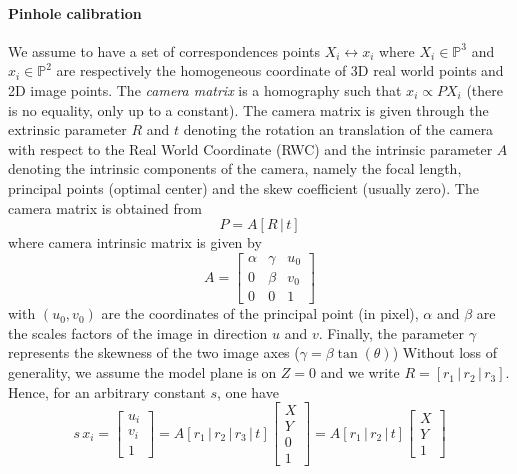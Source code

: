 \documentclass[11pt,a4paper]{article}
\begin{document}
\paragraph{Pinhole calibration}
We assume to have a set of correspondences points $X_i \leftrightarrow x_i$ where $X_i \in \mathbb{P}^3$ and $x_i \in \mathbb{P}^2$ are respectively the homogeneous coordinate of 3D real world points and 2D image points. The \textit{camera matrix} is a homography such that $x_i \propto PX_i$ (there is no equality, only up to a constant). The camera matrix is given through the extrinsic parameter $R$ and $t$ denoting the rotation an translation of the camera with respect to the Real World Coordinate (RWC) and the intrinsic parameter $A$ denoting the intrinsic components of the camera, namely the focal length, principal points (optimal center) and the skew coefficient (usually zero). The camera matrix is obtained from
\begin{equation}
P = A [R \, | \, t]
\end{equation}
where camera intrinsic matrix is given by
\begin{equation}
A = 
\left[
\begin{array}{ccc}
\alpha & \gamma & u_0 \\
0 & \beta & v_0 \\
0 & 0 & 1
\end{array}
\right]
\end{equation}
with $(u_0,v_0)$ are the coordinates of the principal point (in pixel), $\alpha$ and $\beta$ are the scales factors of the image in direction $u$ and $v$. Finally, the parameter $\gamma$ represents the skewness of the two image axes ($\gamma = \beta \tan(\theta)$) Without loss of generality, we assume the model plane is on $Z=0$ and we write $R = [r_1 \,|\,r_2 \,|\,r_3 ]$. Hence, for an arbitrary constant $s$, one have
\begin{equation}
s\, x_i = 
\left[
\begin{array}{c}
u_i \\
v_i \\
1
\end{array}
\right]
= A [r_1 \,|\,r_2 \,|\,r_3 \,|\, t]
\left[
\begin{array}{c}
X \\
Y \\
0 \\
1
\end{array}
\right]
= A [r_1 \,|\,r_2\,|\, t]
\left[
\begin{array}{c}
X \\
Y \\
1
\end{array}
\right]
\end{equation}
\end{document}

